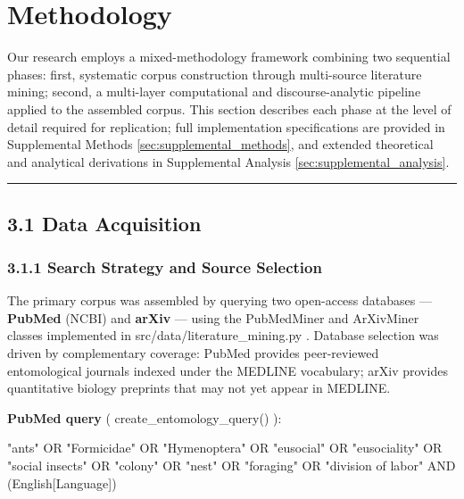 \documentclass[
]{article}
\newenvironment{Shaded}{}{}
\newcommand{\NormalTok}[1]{#1}
\numberwithin{equation}{section}
\renewcommand{\texttt}[1]{%
    \colorbox{codebg}{\color{codefg}\ttfamily #1}%
}
\begin{document}
\newpage

\section{Methodology}\label{sec:methodology}

Our research employs a mixed-methodology framework combining two
sequential phases: first, systematic corpus construction through
multi-source literature mining; second, a multi-layer computational and
discourse-analytic pipeline applied to the assembled corpus. This
section describes each phase at the level of detail required for
replication; full implementation specifications are provided in
Supplemental Methods \ref{sec:supplemental_methods}, and extended
theoretical and analytical derivations in Supplemental Analysis
\ref{sec:supplemental_analysis}.

\begin{center}\rule{0.5\linewidth}{0.5pt}\end{center}

\subsection{3.1 Data Acquisition}\label{sec:data_acquisition}

\subsubsection{3.1.1 Search Strategy and Source
Selection}\label{search-strategy-and-source-selection}

The primary corpus was assembled by querying two open-access databases
--- \textbf{PubMed} (NCBI) and \textbf{arXiv} --- using the
\texttt{PubMedMiner} and \texttt{ArXivMiner} classes implemented in
\texttt{src/data/literature\_mining.py}. Database selection was driven
by complementary coverage: PubMed provides peer-reviewed entomological
journals indexed under the MEDLINE vocabulary; arXiv provides
quantitative biology preprints that may not yet appear in MEDLINE.

\textbf{PubMed query} (\texttt{create\_entomology\_query()}):

\begin{Shaded}
\begin{Highlighting}[]
\NormalTok{"ants" OR "Formicidae" OR "Hymenoptera" OR "eusocial" OR "eusociality"}
\NormalTok{OR "social insects" OR "colony" OR "nest" OR "foraging"}
\NormalTok{OR "division of labor" AND (English[Language])}
\end{Highlighting}
\end{Shaded}
\end{document}
